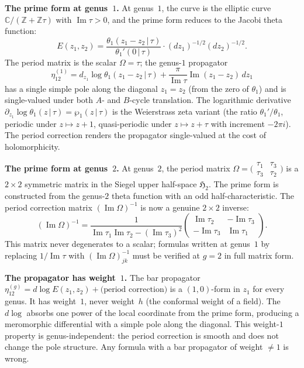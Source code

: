 \documentclass[11pt,reqno]{amsart}
\theoremstyle{definition}
\theoremstyle{remark}
\providecommand{\bC}{\mathbb{C}}
\providecommand{\bZ}{\mathbb{Z}}
\numberwithin{equation}{section}
\begin{document}
\medskip
\noindent\textbf{The prime form at genus~$1$.}\enspace
At genus~$1$, the curve is the elliptic curve $\bC/(\bZ+\bZ\tau)$
with $\operatorname{Im}\tau>0$, and the prime form reduces to the
Jacobi theta function:
\[
E(z_1,z_2)=\frac{\theta_1(z_1-z_2\,|\,\tau)}{\theta_1'(0\,|\,\tau)}\cdot(dz_1)^{-1/2}(dz_2)^{-1/2}.
\]
The period matrix is the scalar $\Omega=\tau$; the genus-$1$ propagator
\[
\eta^{(1)}_{12}=d_{z_1}\log\theta_1(z_1-z_2\,|\,\tau)+\frac{\pi}{\operatorname{Im}\tau}\operatorname{Im}(z_1-z_2)\,dz_1
\]
has a single simple pole along the diagonal $z_1=z_2$ (from the
zero of $\theta_1$) and is single-valued under both $A$- and $B$-cycle
translation. The logarithmic derivative
$\partial_{z_1}\log\theta_1(z\,|\,\tau)=\wp_1(z\,|\,\tau)$ is the
Weierstrass zeta variant (the ratio $\theta_1'/\theta_1$, periodic
under $z\mapsto z+1$, quasi-periodic under $z\mapsto z+\tau$ with
increment $-2\pi i$). The period correction renders the propagator
single-valued at the cost of holomorphicity.

\medskip
\noindent\textbf{The prime form at genus~$2$.}\enspace
At genus~$2$, the period matrix $\Omega=\bigl(\begin{smallmatrix}\tau_1&\tau_3\\\tau_3&\tau_2\end{smallmatrix}\bigr)$
is a $2\times 2$ symmetric matrix in the Siegel upper half-space
$\mathfrak{H}_2$. The prime form is constructed from the genus-$2$
theta function with an odd half-characteristic. The period correction
matrix $(\operatorname{Im}\Omega)^{-1}$ is now a genuine $2\times 2$
inverse:
\[
(\operatorname{Im}\Omega)^{-1}=\frac{1}{\operatorname{Im}\tau_1\operatorname{Im}\tau_2-(\operatorname{Im}\tau_3)^2}\begin{pmatrix}\operatorname{Im}\tau_2&-\operatorname{Im}\tau_3\\-\operatorname{Im}\tau_3&\operatorname{Im}\tau_1\end{pmatrix}.
\]
This matrix never degenerates to a scalar; formulas written at genus~$1$
by replacing $1/\operatorname{Im}\tau$ with $(\operatorname{Im}\Omega)^{-1}_{jk}$
must be verified at $g=2$ in full matrix form.

\medskip
\noindent\textbf{The propagator has weight~$1$.}\enspace
The bar propagator $\eta^{(g)}_{12}=d\log E(z_1,z_2)+\text{(period correction)}$
is a $(1,0)$-form in $z_1$ for every genus. It has weight~$1$, never
weight~$h$ (the conformal weight of a field). The $d\log$ absorbs one
power of the local coordinate from the prime form, producing a
meromorphic differential with a simple pole along the diagonal. This
weight-$1$ property is genus-independent: the period correction is
smooth and does not change the pole structure. Any formula with a bar
propagator of weight $\neq 1$ is wrong.
\end{document}
